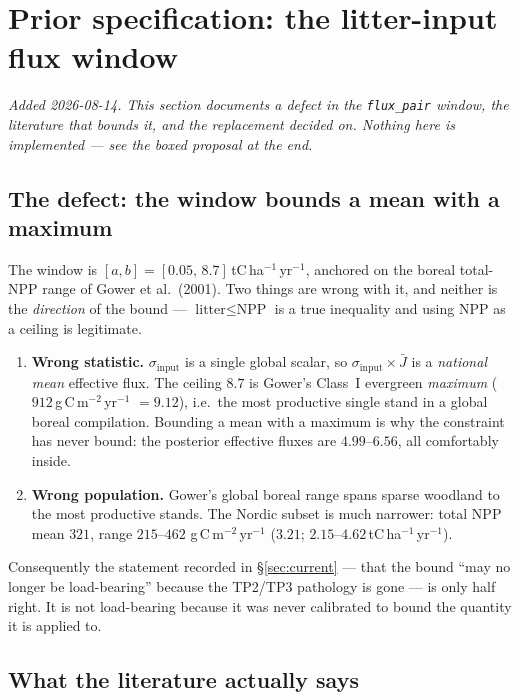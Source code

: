 \documentclass[11pt]{article}
\newcommand{\sinput}{\sigma_{\mathrm{input}}}
\begin{document}
\section{Prior specification: the litter-input flux window}\label{sec:priorspec}

\emph{Added 2026-08-14. This section documents a defect in the \texttt{flux\_pair} window, the
literature that bounds it, and the replacement decided on. Nothing here is implemented --- see
the boxed proposal at the end.}

\subsection{The defect: the window bounds a mean with a maximum}

The window is $[a,b] = [0.05,\,8.7]$\,tC\,ha$^{-1}$\,yr$^{-1}$, anchored on the boreal
total-NPP range of Gower et al.\ (2001). Two things are wrong with it, and neither is the
\emph{direction} of the bound --- $\text{litter}\le\text{NPP}$ is a true inequality and using NPP
as a ceiling is legitimate.

\begin{enumerate}
\item \textbf{Wrong statistic.} $\sinput$ is a single global scalar, so $\sinput\times\bar{J}$ is
a \emph{national mean} effective flux. The ceiling $8.7$ is Gower's Class~I evergreen
\emph{maximum} ($912$\,g\,C\,m$^{-2}$\,yr$^{-1}$ $=9.12$), i.e.\ the most productive single stand
in a global boreal compilation. Bounding a mean with a maximum is why the constraint has never
bound: the posterior effective fluxes are $4.99$--$6.56$, all comfortably inside.
\item \textbf{Wrong population.} Gower's global boreal range spans sparse woodland to the most
productive stands. The Nordic subset is much narrower: total NPP mean $321$, range $215$--$462$
g\,C\,m$^{-2}$\,yr$^{-1}$ ($3.21$; $2.15$--$4.62$\,tC\,ha$^{-1}$\,yr$^{-1}$).
\end{enumerate}

Consequently the statement recorded in \S\ref{sec:current} --- that the bound ``may no longer be
load-bearing'' because the TP2/TP3 pathology is gone --- is only half right. It is not
load-bearing because it was never calibrated to bound the quantity it is applied to.

\subsection{What the literature actually says}
\end{document}
